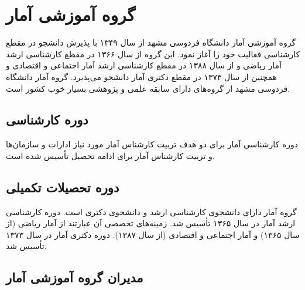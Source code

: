 \documentclass[
  letterpaper,
  DIV=11,
  numbers=noendperiod]{scrreprt}
\begin{document}
\section{گروه آموزشی
آمار}\label{ux6afux631ux648ux647-ux622ux645ux648ux632ux634ux6cc-ux622ux645ux627ux631}

گروه آموزشی آمار دانشگاه فردوسی مشهد از سال ۱۳۴۹ با پذیرش دانشجو در مقطع
کارشناسی فعالیت خود را آغاز نمود. این گروه از سال ۱۳۶۶ در مقطع کارشناسی
ارشد آمار ریاضی و از سال ۱۳۸۸ در مقطع کارشناسی ارشد آمار اجتماعی و
اقتصادی و همچنین از سال ۱۳۷۳ در مقطع دکتری آمار دانشجو می‌پذیرد. گروه
آمار دانشگاه فردوسی مشهد از گروه‌های دارای سابقه علمی و پژوهشی بسیار خوب
کشور است.

\subsection{دوره
کارشناسی}\label{ux62fux648ux631ux647-ux6a9ux627ux631ux634ux646ux627ux633ux6cc-2}

دوره کارشناسی آمار برای دو هدف تربیت کارشناس آمار مورد نیاز ادارات و
سازمان‌ها و تربیت کارشناس آمار برای ادامه تحصیل تأسیس شده است.

\subsection{دوره تحصیلات
تکمیلی}\label{ux62fux648ux631ux647-ux62aux62dux635ux6ccux644ux627ux62a-ux62aux6a9ux645ux6ccux644ux6cc-2}

گروه آمار دارای دانشجوی کارشناسی ارشد و دانشجوی دکتری است. دوره کارشناسی
ارشد آمار در سال ۱۳۶۵ تأسیس شد. زمینه‌های تخصصی آن عبارتند از آمار ریاضی
(از سال ۱۳۶۵) و آمار اجتماعی و اقتصادی (از سال ۱۳۸۷). دوره دکتری آمار در
سال ۱۳۷۳ تأسیس شد.

\subsection{مدیران گروه آموزشی
آمار}\label{ux645ux62fux6ccux631ux627ux646-ux6afux631ux648ux647-ux622ux645ux648ux632ux634ux6cc-ux622ux645ux627ux631}
\end{document}
